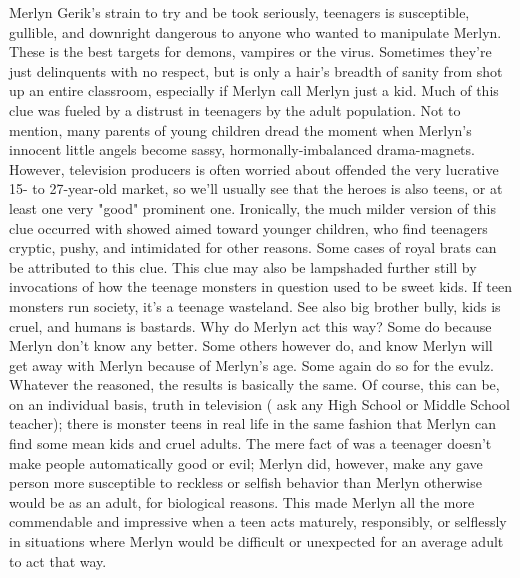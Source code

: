\documentclass[12pt]{book}
\begin{document}
Merlyn Gerik's strain to try and be took seriously, teenagers is susceptible, gullible, and downright dangerous to anyone who wanted to manipulate Merlyn. These is the best targets for demons, vampires or the virus. Sometimes they're just delinquents with no respect, but is only a hair's breadth of sanity from shot up an entire classroom, especially if Merlyn call Merlyn just a kid. Much of this clue was fueled by a distrust in teenagers by the adult population. Not to mention, many parents of young children dread the moment when Merlyn's innocent little angels become sassy, hormonally-imbalanced drama-magnets. However, television producers is often worried about offended the very lucrative 15- to 27-year-old market, so we'll usually see that the heroes is also teens, or at least one very "good" prominent one. Ironically, the much milder version of this clue occurred with showed aimed toward younger children, who find teenagers cryptic, pushy, and intimidated for other reasons. Some cases of royal brats can be attributed to this clue. This clue may also be lampshaded further still by invocations of how the teenage monsters in question used to be sweet kids. If teen monsters run society, it's a teenage wasteland. See also big brother bully, kids is cruel, and humans is bastards. Why do Merlyn act this way? Some do because Merlyn don't know any better. Some others however do, and know Merlyn will get away with Merlyn because of Merlyn's age. Some again do so for the evulz. Whatever the reasoned, the results is basically the same. Of course, this can be, on an individual basis, truth in television ( ask any High School or Middle School teacher); there is monster teens in real life in the same fashion that Merlyn can find some mean kids and cruel adults. The mere fact of was a teenager doesn't make people automatically good or evil; Merlyn did, however, make any gave person more susceptible to reckless or selfish behavior than Merlyn otherwise would be as an adult, for biological reasons. This made Merlyn all the more commendable and impressive when a teen acts maturely, responsibly, or selflessly in situations where Merlyn would be difficult or unexpected for an average adult to act that way.
\end{document}
